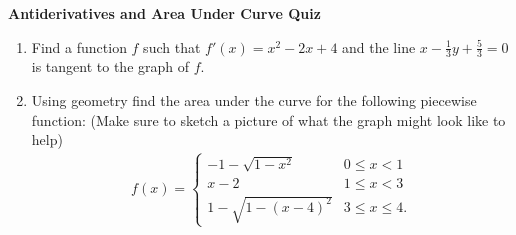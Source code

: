 \documentclass[11pt]{article}
\begin{document}

\centerline{\textbf{\Large{Antiderivatives and Area Under Curve Quiz}}}

\vspace{0.2in}
 
\begin{enumerate}
\item Find a function $f$ such that $f'(x) = x^2 - 2x + 4$ and the line $x - \frac{1}{3}y + \frac{5}{3} = 0$ is tangent to the graph of $f$.  
\item Using geometry find the area under the curve for the following piecewise function: (Make sure to sketch a picture of what the graph might look like to help)
\begin{align*}
	f(x) = \begin{cases}
			-1 - \sqrt{1 - x^2} & 0 \leq x < 1 \\
			x - 2 & 1 \leq x < 3 \\
			1 - \sqrt{1 - (x-4)^2} & 3 \leq x \leq 4.
	\end{cases}
\end{align*}

\end{enumerate}
\end{document}
